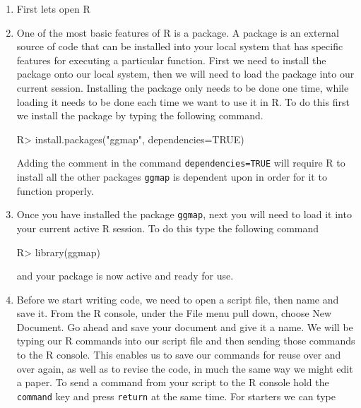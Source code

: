 \documentclass{article}
\newenvironment{Schunk}{}{}
\newcommand{\code}[1]{\texttt{#1}}
\newcommand{\pkg}[1]{\mbox{\texttt{#1}}}
\newcommand{\proglang}[1]{\textsf{#1}}
\begin{document}
\begin{enumerate}[leftmargin=15mm]

\item First lets open \proglang{R}

\item One of the most basic features of R is a package.  A package is an external source of code that can be installed into your local system that has specific features for executing a particular function.  First we need to install the package onto our local system, then we will need to load the package into our current session.  Installing the package only needs to be done one time, while loading it needs to be done each time we want to use it in \proglang{R}.  To do this first we install the package by typing the following command.

\begin{Schunk}
\begin{Sinput}
R> install.packages("ggmap", dependencies=TRUE)
\end{Sinput}
\end{Schunk}

Adding the comment in the command \code{dependencies=TRUE} will require \proglang{R} to install all the other packages \pkg{ggmap} is dependent upon in order for it to function properly.

\item Once you have installed the package \pkg{ggmap}, next you will need to load it into your current active \proglang{R} session. To do this type the following command

\begin{Schunk}
\begin{Sinput}
R> library(ggmap)
\end{Sinput}
\end{Schunk}

and your package is now active and ready for use.

\item Before we start writing code, we need to open a script file, then name and save it.  From the \proglang{R} console, under the File menu pull down, choose New Document.  Go ahead and save your document and give it a name.  We will be typing our \proglang{R} commands into our script file and then sending those commands to the \proglang{R}  console.  This enables us to save our commands for reuse over and over again, as well as to revise the code, in much the same way we might edit a paper.  To send a command from your script to the \proglang{R} console hold the \code{command} key and press \code{return} at the same time.  For starters we can type 


\end{enumerate}
\end{document}
